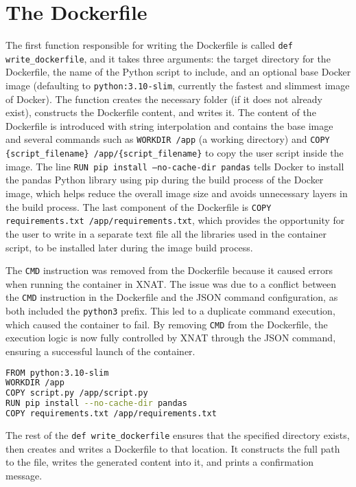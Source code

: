  \section{The Dockerfile}
 
The first function responsible for writing the Dockerfile is called \texttt{def write\_dockerfile}, and it takes three arguments: the target directory for the Dockerfile, the name of the Python script to include, and an optional base Docker image (defaulting to \texttt{python:3.10-slim}, currently the fastest and slimmest image of Docker). The function creates the necessary folder (if it does not already exist), constructs the Dockerfile content, and writes it. The content of the Dockerfile is introduced with string interpolation and contains the base image and several commands such as \texttt{WORKDIR /app} (a working directory) and \texttt{COPY \{script\_filename\} /app/\{script\_filename\}} to copy the user script inside the image. The line \texttt{RUN pip install --no-cache-dir pandas} tells Docker to install the pandas Python library using pip during the build process of the Docker image, which helps reduce the overall image size and avoids unnecessary layers in the build process. The last component of the Dockerfile is \texttt{COPY requirements.txt /app/requirements.txt}, which provides the opportunity for the user to write in a separate text file all the libraries used in the container script, to be installed later during the image build process.


The \texttt{CMD} instruction was removed from the Dockerfile because it caused errors when running the container in XNAT. The issue was due to a conflict between the \texttt{CMD} instruction in the Dockerfile and the JSON command configuration, as both included the \texttt{python3} prefix. This led to a duplicate command execution, which caused the container to fail. By removing \texttt{CMD} from the Dockerfile, the execution logic is now fully controlled by XNAT through the JSON command, ensuring a successful launch of the container.






\begin{lstlisting}[language=bash,caption={Dockerfile}]
FROM python:3.10-slim
WORKDIR /app
COPY script.py /app/script.py
RUN pip install --no-cache-dir pandas
COPY requirements.txt /app/requirements.txt
\end{lstlisting}

The rest of the \texttt{def write\_dockerfile} ensures that the specified directory exists, then creates and writes a Dockerfile to that location. It constructs the full path to the file, writes the generated content into it, and prints a confirmation message.


